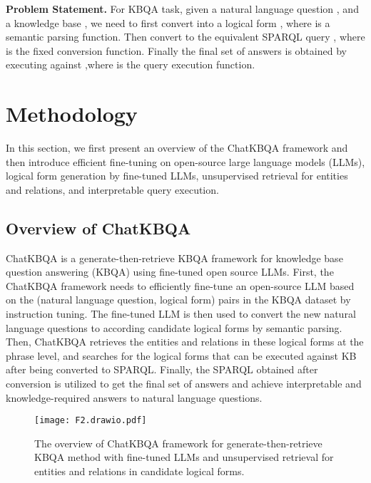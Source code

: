 \documentclass{article} \usepackage{iclr2024_conference,times}
\begin{document}
\textbf{Problem Statement. }For KBQA task, given a natural language question , and a knowledge base , we need to first convert  into a logical form , where  is a semantic parsing function. Then convert  to the equivalent SPARQL query , where  is the fixed conversion function. Finally the final set of answers  is obtained by executing  against ,where  is the query execution function.









\section{Methodology}

In this section, we first present an overview of the ChatKBQA framework and then introduce efficient fine-tuning on open-source large language models (LLMs), logical form generation by fine-tuned LLMs, unsupervised retrieval for entities and relations, and interpretable query execution.

\subsection{Overview of ChatKBQA}

ChatKBQA is a generate-then-retrieve KBQA framework for knowledge base question answering (KBQA) using fine-tuned open source LLMs. First, the ChatKBQA framework needs to efficiently fine-tune an open-source LLM based on the (natural language question, logical form) pairs in the KBQA dataset by instruction tuning. The fine-tuned LLM is then used to convert the new natural language questions to according candidate logical forms by semantic parsing. Then, ChatKBQA retrieves the entities and relations in these logical forms at the phrase level, and searches for the logical forms that can be executed against KB after being converted to SPARQL. Finally, the SPARQL obtained after conversion is utilized to get the final set of answers and achieve interpretable and knowledge-required answers to natural language questions.


\begin{figure*}[h!t]
\centering
\texttt{[image: F2.drawio.pdf]}
\caption{The overview of ChatKBQA framework for generate-then-retrieve KBQA method with fine-tuned LLMs and unsupervised retrieval for entities and relations in candidate logical forms.}
\label{f2}
\end{figure*}
\end{document}
